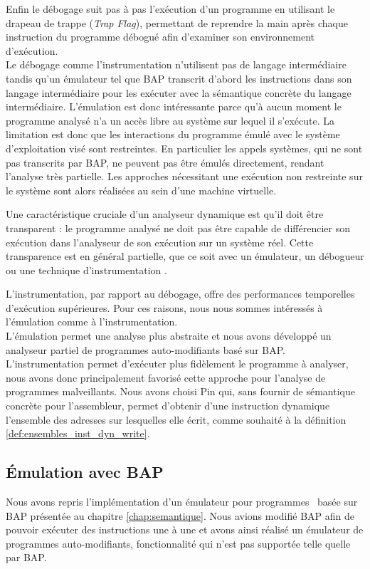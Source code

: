 Enfin le débogage suit pas à pas l'exécution d'un programme en utilisant le drapeau de trappe (\emph{Trap Flag}), permettant de reprendre la main après chaque instruction du programme débogué afin d'examiner son environnement d'exécution.
\\

Le débogage comme l'instrumentation n'utilisent pas de langage intermédiaire tandis qu'un émulateur tel que BAP transcrit d'abord les instructions dans son langage intermédiaire pour les exécuter avec la sémantique concrète du langage intermédiaire.
L'émulation est donc intéressante parce qu'à aucun moment le programme analysé n'a un accès libre au système sur lequel il s'exécute.
La limitation est donc que les interactions du programme émulé avec le système d'exploitation visé sont restreintes.
En particulier les appels systèmes, qui ne sont pas transcrits par BAP, ne peuvent pas être émulés directement, rendant l'analyse très partielle.
Les approches nécessitant une exécution non restreinte sur le système sont alors réalisées au sein d'une machine virtuelle.

Une caractéristique cruciale d'un analyseur dynamique est qu'il doit être transparent : le programme analysé ne doit pas être capable de différencier son exécution dans l'analyseur de son exécution sur un système réel.
Cette transparence est en général partielle, que ce soit avec un émulateur, un débogueur ou une technique d'instrumentation \cite{Ferrie07}.

L'instrumentation, par rapport au débogage, offre des performances temporelles d'exécution supérieures.
Pour ces raisons, nous nous sommes intéressés à l'émulation comme à l'instrumentation.
\\

L'émulation permet une analyse plus abstraite et nous avons développé un analyseur partiel de programmes auto-modifiants basé sur BAP.
L'instrumentation permet d'exécuter plus fidèlement le programme à analyser, nous avons donc principalement favorisé cette approche pour l'analyse de programmes malveillants. Nous avons choisi Pin qui, sans fournir de sémantique concrète pour l'assembleur, permet d'obtenir d'une instruction dynamique l'ensemble des adresses sur lesquelles elle écrit, comme souhaité à la définition \ref{def:ensembles_inst_dyn_write}.

\subsection{Émulation avec BAP}
Nous avons repris l'implémentation d'un émulateur pour programmes \sms\ basée sur BAP présentée au chapitre \ref{chap:semantique}. Nous avions modifié BAP afin de pouvoir exécuter des instructions une à une et avons ainsi réalisé un émulateur de programmes auto-modifiants, fonctionnalité qui n'est pas supportée telle quelle par BAP.

